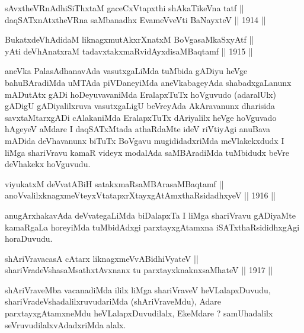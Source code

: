 \begin{shl}
sAvxtheVRnAdhiSiThxtaM gaceCxVtapxthi shAkaTikeVna tatf || \\
daqSATxnAtxtheVRna saMbanadhx EvameVveVti BaNayxteV \hfill || 1914 ||
  
\end{shl}

\begin{shl}
BukatxdeVhAdidaM liknagxmutAkxrXnatxM BoVgasaMkaSxyAtf || \\
yAti deVhAnatxraM tadavxtakxmaRvidAyxdisaMBaqtamf \hfill || 1915 ||
  
\end{shl}

\begin{artha}
aneVka PalasAdhanavAda vasutxgaLiMda tuMbida gADiyu heVge
bahuBAradiMda uMTAda piVDaneyiMda aneVkabageyAda shabadxgaLanunx
mADutAtx gADi hoDeyuvavaniMda EralapxTuTx hoVguvudo (adaralUlx) gADigU
gADiyalilxruva vasutxgaLigU beVreyAda AkAravanunx dharisida
savxtaMtarxgADi cAlakaniMda EralapxTuTx dAriyalilx heVge hoVguvado
hAgeyeV aMdare I daqSATxMtada athaRdaMte ideV riVtiyAgi anuBava mADida
deVhavanunx biTuTx BoVgavu mugididadxriMda meVlakekxdudx I liMga
shariVravu kamaR videyx modalAda saMBAradiMda tuMbidudx beVre
deVhakekx hoVguvudu.
\end{artha}

\begin{shl}
viyukatxM deVvatABiH satakxmaRsaMBArasaMBaqtamf || \\
anoVvalilxknagxmeVteyxVtatapxrXtayxgAtAmxthaRsidadhxyeV \hfill || 1916 ||
  
\end{shl}

\begin{artha}
anugArxhakavAda deVvategaLiMda biDalapxTa I liMga shariVravu gADiyaMte
kamaRgaLa horeyiMda tuMbidAdxgi parxtayxgAtamxna iSATxthaRsididhxgAgi
horaDuvudu.
\end{artha}


\begin{shl}
shAriVravacasA cAtarx liknagxmeVvABidhiVyateV || \\
shariVradeVshasaMsathxtAvxnanx tu parxtayxknaknxsaMhateV \hfill || 1917 ||
  
\end{shl}

\begin{artha}
shAriVraveMba vacanadiMda ililx liMga shariVraveV heVLalapxDuvudu,
shariVradeVshadalilxruvudariMda (shAriVraveMdu), Adare
parxtayxgAtamxneMdu heVLalapxDuvudilalx, EkeMdare ? samUhadalilx
seVruvudilalxvAdadxriMda alalx.
\end{artha}

